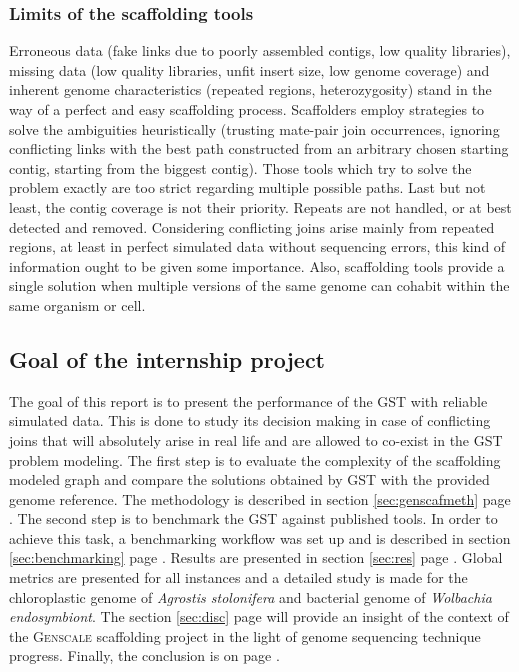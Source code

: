 \documentclass[12pt]{article}
\newcommand*{\fulleref}[1]{section \hyperref[{#1}] {\ref*{#1}} page {\pageref{#1}}}%
\begin{document}
\subsubsection{Limits of the scaffolding tools}
 Erroneous data (fake links due to poorly assembled contigs, low quality libraries), missing data (low quality libraries, unfit insert size, low genome coverage) and inherent genome characteristics (repeated regions,  heterozygosity) stand in the way of a perfect and easy scaffolding process.  Scaffolders employ strategies to solve the ambiguities heuristically (trusting mate-pair join occurrences, ignoring conflicting links with the best path constructed from an arbitrary chosen starting contig, starting from the biggest contig). Those tools which try to solve the problem exactly are too strict regarding multiple possible paths. Last but not least, the contig coverage is not their priority. Repeats are not handled, or at best detected and removed. Considering conflicting joins arise mainly from repeated regions, at least in perfect simulated data without sequencing errors, this kind of information ought to be given some importance. Also, scaffolding tools provide a single solution when multiple versions of the same genome can cohabit within the same organism or cell. 
 
\subsection{Goal of the internship project}
The goal of this report is to present the performance of the GST with reliable simulated data. This is done to study its decision making in case of conflicting joins that will absolutely arise in real life and are allowed to co-exist in the GST problem modeling. The first step is to evaluate the complexity of the scaffolding modeled graph and compare the solutions obtained by GST with the provided genome reference. The methodology is described in \fulleref{sec:genscafmeth}. The second step is to benchmark the GST against published tools. In order to achieve this task, a benchmarking workflow was set up and is described in \fulleref{sec:benchmarking}. Results are presented in \fulleref{sec:res}. Global metrics are presented for all instances and a detailed study is made for the chloroplastic genome of \textit{Agrostis stolonifera} and bacterial genome of \textit{Wolbachia endosymbiont}. The \fulleref{sec:disc} will provide an insight of the context of the \textsc{Genscale} scaffolding project in the light of genome sequencing technique progress. Finally, the conclusion is on page \pageref{sec:conc}.
\end{document}
